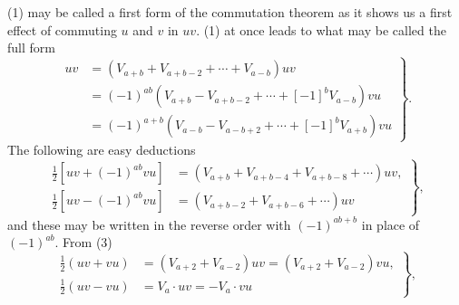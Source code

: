 \documentclass[11pt]{article}
\begin{document}
\indent (1) may be called a first form of the commutation theorem as it shows us a first effect of commuting $u$ and $v$ in $uv$. (1) at once leads to what may be called the full form
\begin{equation}\left.\begin{aligned}uv&=(V_{a+b}+V_{a+b-2}+\cdots+V_{a-b})uv\\&=(-1)^{ab}(V_{a+b}-V_{a+b-2}+\cdots+[-1]^bV_{a-b})vu\\&=(-1)^{a+b}(V_{a-b}-V_{a-b+2}+\cdots+[-1]^bV_{a+b})vu\end{aligned}\right\}.\tag{2}\end{equation}
The following are easy deductions
\begin{equation}\left.\begin{aligned}\tfrac12[uv+(-1)^{ab}vu]&=(V_{a+b}+V_{a+b-4}+V_{a+b-8}+\cdots)uv,\\\tfrac12[uv-(-1)^{ab}vu]&=(V_{a+b-2}+V_{a+b-6}+\cdots)uv\end{aligned}\right\},\tag{3}\end{equation}
and these may be written in the reverse order with $(-1)^{ab+b}$ in place of $(-1)^{ab}$. From (3)
\begin{equation}\left.\begin{aligned}\tfrac12(uv+vu)&=(V_{a+2}+V_{a-2})uv=(V_{a+2}+V_{a-2})vu,\\\tfrac12(uv-vu)&=V_a\cdot uv=-V_a\cdot vu\end{aligned}\right\},\tag{4}\end{equation}
\end{document}
